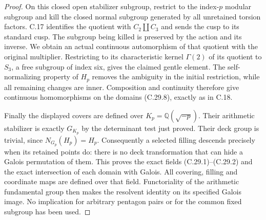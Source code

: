 \begin{proof}
On this closed open stabilizer subgroup, restrict
to the index-$p$ modular subgroup and kill the
closed normal subgroup generated by all unretained
torsion factors. C.17 identifies the quotient with
$C_2\amalg C_3$ and sends the cusp to its standard
cusp. The subgroup being killed is preserved by
the action and its inverse. We obtain an actual
continuous automorphism of that quotient with
the original multiplier. Restricting to its
characteristic kernel $\Gamma(2)$ of its quotient
to $S_3$, a free subgroup of index six, gives the
claimed gentle element. The self-normalizing
property of $H_p$ removes the ambiguity in the
initial restriction, while all remaining changes
are inner. Composition and continuity therefore
give continuous homomorphisms on the domains
(C.29.8), exactly as in C.18.

Finally the displayed covers are defined over
$K_p=\mathbb Q(\sqrt{-p})$. Their arithmetic
stabilizer is exactly $G_{K_p}$ by the determinant
test just proved. Their deck group is trivial,
since $N_{G_p}(H_p)=H_p$. Consequently a selected
filling descends precisely when its retained
points do: there is no deck transformation that
can hide a Galois permutation of them. This proves
the exact fields (C.29.1)--(C.29.2) and the exact
intersection of each domain with Galois.
All covering, filling and coordinate maps are
defined over that field. Functoriality of the
arithmetic fundamental group then makes the
resolvent identity on its specified Galois image.
No implication for arbitrary pentagon pairs or
for the common fixed subgroup has been used.
\end{proof}

